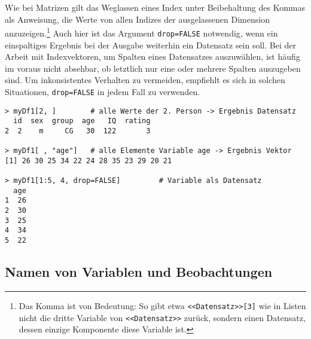 Wie bei Matrizen gilt das Weglassen eines Index unter Beibehaltung des Kommas als Anweisung, die Werte von allen Indizes der ausgelassenen Dimension anzuzeigen.\footnote{Das Komma ist von Bedeutung: So gibt etwa \lstinline!<<Datensatz>>[3]! wie in Listen nicht die dritte Variable von \lstinline!<<Datensatz>>! zurück, sondern einen Datensatz, dessen einzige Komponente diese Variable ist.} Auch hier ist das Argument \lstinline!drop=FALSE! notwendig, wenn ein einspaltiges Ergebnis bei der Ausgabe weiterhin ein Datensatz sein soll. Bei der Arbeit mit Indexvektoren, um Spalten eines Datensatzes auszuwählen, ist häufig im voraus nicht absehbar, ob letztlich nur eine oder mehrere Spalten auszugeben sind. Um inkonsistentes Verhalten zu vermeiden, empfiehlt es sich in solchen Situationen, \lstinline!drop=FALSE! in jedem Fall zu verwenden.
\begin{lstlisting}
> myDf1[2, ]        # alle Werte der 2. Person -> Ergebnis Datensatz
  id  sex  group  age   IQ  rating
2  2    m     CG   30  122       3

> myDf1[ , "age"]   # alle Elemente Variable age -> Ergebnis Vektor
[1] 26 30 25 34 22 24 28 35 23 29 20 21

> myDf1[1:5, 4, drop=FALSE]         # Variable als Datensatz
  age
1  26
2  30
3  25
4  34
5  22
\end{lstlisting}


\subsection{Namen von Variablen und Beobachtungen}
\label{sec:rowNames}

